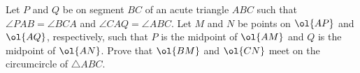 Let $P$ and $Q$ be on segment $BC$ of an acute triangle $ABC$
such that $\angle PAB=\angle BCA$ and $\angle CAQ=\angle ABC$.
Let $M$ and $N$ be points on $\ol{AP}$ and $\ol{AQ}$,
respectively, such that $P$ is the midpoint of $\ol{AM}$
and $Q$ is the midpoint of $\ol{AN}$.
Prove that $\ol{BM}$ and $\ol{CN}$ meet on the
circumcircle of $\triangle ABC$.
